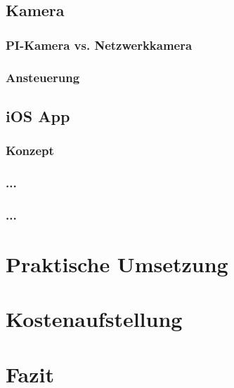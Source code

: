 \documentclass[12pt,a4paper]{scrreprt}
\begin{document}
\section{Kamera}
\subsection{PI-Kamera vs. Netzwerkkamera}
\subsection{Ansteuerung}

\section{iOS App}
\subsection{Konzept}
\subsection{...}
\subsection{...}

\chapter{Praktische Umsetzung}

\chapter{Kostenaufstellung}

\chapter{Fazit}


 
\end{document}
